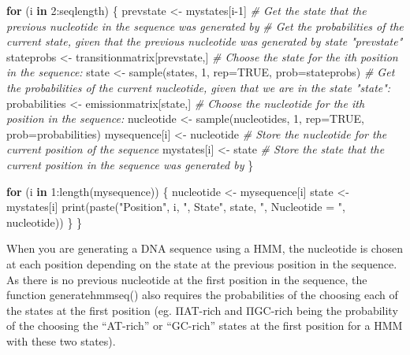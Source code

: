 \documentclass[
]{book}
\newenvironment{Shaded}{\begin{snugshade}}{\end{snugshade}}
\newcommand{\AttributeTok}[1]{\textcolor[rgb]{0.77,0.63,0.00}{#1}}
\newcommand{\CommentTok}[1]{\textcolor[rgb]{0.56,0.35,0.01}{\textit{#1}}}
\newcommand{\ConstantTok}[1]{\textcolor[rgb]{0.00,0.00,0.00}{#1}}
\newcommand{\ControlFlowTok}[1]{\textcolor[rgb]{0.13,0.29,0.53}{\textbf{#1}}}
\newcommand{\DecValTok}[1]{\textcolor[rgb]{0.00,0.00,0.81}{#1}}
\newcommand{\FunctionTok}[1]{\textcolor[rgb]{0.00,0.00,0.00}{#1}}
\newcommand{\NormalTok}[1]{#1}
\newcommand{\OtherTok}[1]{\textcolor[rgb]{0.56,0.35,0.01}{#1}}
\newcommand{\SpecialCharTok}[1]{\textcolor[rgb]{0.00,0.00,0.00}{#1}}
\newcommand{\StringTok}[1]{\textcolor[rgb]{0.31,0.60,0.02}{#1}}
\begin{document}
\begin{Shaded}
\begin{Highlighting}[]
     \ControlFlowTok{for}\NormalTok{ (i }\ControlFlowTok{in} \DecValTok{2}\SpecialCharTok{:}\NormalTok{seqlength)}
\NormalTok{     \{}
\NormalTok{        prevstate    }\OtherTok{\textless{}{-}}\NormalTok{ mystates[i}\DecValTok{{-}1}\NormalTok{]           }\CommentTok{\# Get the state that the previous nucleotide in the sequence was generated by}
        \CommentTok{\# Get the probabilities of the current state, given that the previous nucleotide was generated by state "prevstate"}
\NormalTok{        stateprobs   }\OtherTok{\textless{}{-}}\NormalTok{ transitionmatrix[prevstate,]}
        \CommentTok{\# Choose the state for the ith position in the sequence:}
\NormalTok{        state        }\OtherTok{\textless{}{-}} \FunctionTok{sample}\NormalTok{(states, }\DecValTok{1}\NormalTok{, }\AttributeTok{rep=}\ConstantTok{TRUE}\NormalTok{, }\AttributeTok{prob=}\NormalTok{stateprobs)}
        \CommentTok{\# Get the probabilities of the current nucleotide, given that we are in the state "state":}
\NormalTok{        probabilities }\OtherTok{\textless{}{-}}\NormalTok{ emissionmatrix[state,]}
        \CommentTok{\# Choose the nucleotide for the ith position in the sequence:}
\NormalTok{        nucleotide   }\OtherTok{\textless{}{-}} \FunctionTok{sample}\NormalTok{(nucleotides, }\DecValTok{1}\NormalTok{, }\AttributeTok{rep=}\ConstantTok{TRUE}\NormalTok{, }\AttributeTok{prob=}\NormalTok{probabilities)}
\NormalTok{        mysequence[i] }\OtherTok{\textless{}{-}}\NormalTok{ nucleotide             }\CommentTok{\# Store the nucleotide for the current position of the sequence}
\NormalTok{        mystates[i]  }\OtherTok{\textless{}{-}}\NormalTok{ state                   }\CommentTok{\# Store the state that the current position in the sequence was generated by}
\NormalTok{     \}}

     \ControlFlowTok{for}\NormalTok{ (i }\ControlFlowTok{in} \DecValTok{1}\SpecialCharTok{:}\FunctionTok{length}\NormalTok{(mysequence))}
\NormalTok{     \{}
\NormalTok{        nucleotide   }\OtherTok{\textless{}{-}}\NormalTok{ mysequence[i]}
\NormalTok{        state        }\OtherTok{\textless{}{-}}\NormalTok{ mystates[i]}
        \FunctionTok{print}\NormalTok{(}\FunctionTok{paste}\NormalTok{(}\StringTok{"Position"}\NormalTok{, i, }\StringTok{", State"}\NormalTok{, state, }\StringTok{", Nucleotide = "}\NormalTok{, nucleotide))}
\NormalTok{     \}}
\NormalTok{  \}}
\end{Highlighting}
\end{Shaded}

When you are generating a DNA sequence using a HMM, the nucleotide is chosen at each position depending on the state at the previous position in the sequence. As there is no previous nucleotide at the first position in the sequence, the function generatehmmseq() also requires the probabilities of the choosing each of the states at the first position (eg. ΠAT-rich and ΠGC-rich being the probability of the choosing the ``AT-rich'' or ``GC-rich'' states at the first position for a HMM with these two states).
\end{document}
